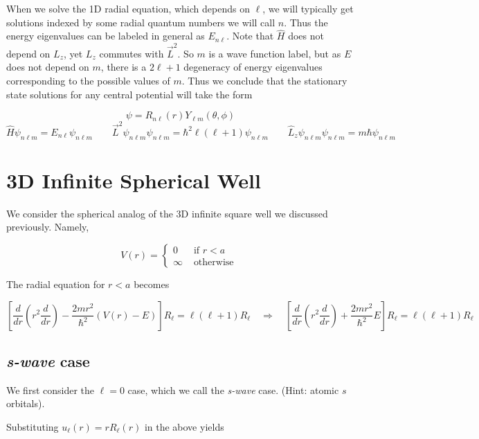 When we solve the 1D radial equation, which depends on $\ell $, we will
typically get solutions indexed by some radial quantum numbers we will call
$n$. Thus the energy eigenvalues can be labeled in general as $E_{n\ell} $.
Note that $\hat{H}$ does not depend on $L_z$, yet $L_z$ commutes with
$\vec{L}^2$. So $m$ is a wave function label, but as $E$ does not depend on
$m$, there is a $2\ell +1$ degeneracy of energy eigenvalues corresponding to
the possible values of $m$. Thus we conclude that the stationary state
solutions for any central potential will take the form 

\[ \psi = R_{n\ell }(r) Y_{\ell m}(\theta, \phi) \] 
\[ \hat{H}\psi_{n \ell m} = E_{n \ell } \psi_{n \ell m} \qquad \vec{L}^2
  \psi_{n \ell m} \psi_{n \ell m} = \hbar^2 \ell (\ell +1) \psi_{n \ell m}
  \qquad \hat{L}_z \psi_{n \ell m} \psi_{n\ell m} = m\hbar\psi_{n\ell m} \]
  \vspace{3px}

\section{3D Infinite Spherical Well}

We consider the spherical analog of the 3D infinite square well we discussed
previously. Namely, 

\[
 V(r) = \begin{cases}
   0 &\text{ if } r<a \\ \infty &\text{ otherwise }  
 \end{cases} 
\] \vspace{3px}

The radial equation for $r < a$ becomes 

\[
\left[ \frac{d }{d r} \left( r^2 \frac{d }{d r}  \right)
- \frac{2mr^2}{\hbar^2} (V(r) - E) \right] R_\ell  = \ell (\ell +1) R_\ell
\quad \Rightarrow \quad \left[ \frac{d }{d r} \left( r^2 \frac{d}{dr} \right)
+ \frac{2mr^2}{\hbar^2} E\right] R_\ell = \ell (\ell +1) R_\ell 
\] \vspace{3px}


\subsection{\textit{s-wave} case}

We first consider the $\ell = 0$ case, which we call the  \textit{s-wave} case.
(Hint: atomic $s$ orbitals). 

Substituting $u_\ell (r) = r R_\ell (r)$ in the above yields 


